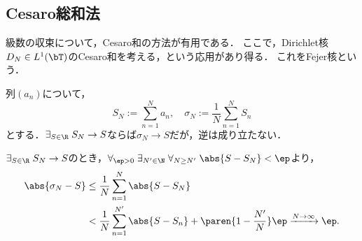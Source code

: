 \documentclass[uplatex,dvipdfmx]{jsreport}
\begin{document}
\subsection{Cesaro総和法}

\begin{tcolorbox}[colframe=ForestGreen, colback=ForestGreen!10!white,breakable,colbacktitle=ForestGreen!40!white,coltitle=black,fonttitle=\bfseries\sffamily,
title=]
    級数の収束について，Cesaro和の方法が有用である．
    ここで，Dirichlet核$D_N\in L^1(\bT)$のCesaro和を考える，という応用があり得る．
    これをFejer核という．
\end{tcolorbox}

\begin{lemma}[Cesaro和]
    列$(a_n)$について，
    \[S_N:=\sum_{n=1}^Na_n,\quad\sigma_N:=\frac{1}{N}\sum_{n=1}^NS_n\]
    とする．$\exists_{S\in\R}\;S_N\to S$ならば$\sigma_N\to S$だが，逆は成り立たない．
\end{lemma}
\begin{Proof}
    $\exists_{S\in\R}\;S_N\to S$のとき，$\forall_{\ep>0}\;\exists_{N'\in\N}\;\forall_{N\ge N'}\;\abs{S-S_N}<\ep$より，
    \begin{align*}
        \abs{\sigma_N-S}&\le\frac{1}{N}\sum_{n=1}^N\abs{S-S_N}\\
        &<\frac{1}{N}\sum_{n=1}^{N'}\abs{S-S_n}+\paren{1-\frac{N'}{N}}\ep\xrightarrow{N\to\infty}\ep.
    \end{align*}
\end{Proof}
\end{document}
